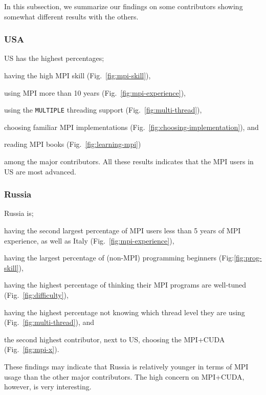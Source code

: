 \documentclass[preprint,5p,times]{elsarticle}
\def\country{contributor}%
\def\countries{contributors}%
\def\mcountries{major contributors\xspace{}}%
\begin{document}
In this subsection, we summarize our findings on some \countries
showing somewhat different results with the others.

\subsubsection*{USA}

US has the highest percentages;
\begin{enumerate*}
\item having the high MPI skill (Fig.~\ref{fig:mpi-skill}),
\item using MPI more than 10 years (Fig.~\ref{fig:mpi-experience}),
\item using the {\tt MULTIPLE} threading support
  (Fig.~\ref{fig:multi-thread}),
\item choosing familiar MPI implementations
  (Fig.~\ref{fig:choosing-implementation}), and
\item reading MPI books (Fig.~\ref{fig:learning-mpi})
\end{enumerate*}
among the \mcountries. All these results indicates that the MPI
users in US are most advanced.

\subsubsection*{Russia}

Russia is;
\begin{enumerate*}
\item having the second largest percentage of MPI users less than 5
  years of MPI experience, as well as Italy
  (Fig.~\ref{fig:mpi-experience}),
\item having the largest percentage of (non-MPI) programming beginners
  (Fig:\ref{fig:prog-skill}),
\item having the highest percentage of thinking their MPI programs are
  well-tuned (Fig.~\ref{fig:difficulty}),
\item having the highest percentage not knowing which thread level
  they are using (Fig.~\ref{fig:multi-thread}), and
\item the second highest \country, next to US, choosing the MPI+CUDA
  (Fig.~\ref{fig:mpi-x}).
\end{enumerate*}

These findings may indicate that Russia is relatively younger in terms
of MPI usage than the other \mcountries. The high concern on
MPI+CUDA, however, is very interesting.
\end{document}
